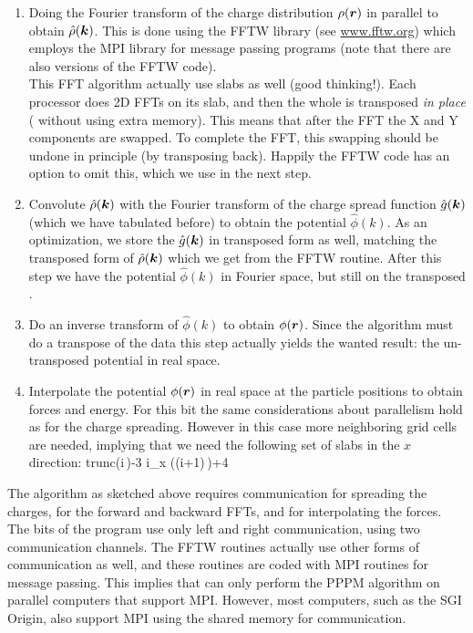 {\begin{enumerate}
\item   Doing the Fourier transform of the charge distribution $\rho(\mbox{\boldmath ${r}$})$ 
        in parallel to obtain $\hat{\rho}(\mbox{\boldmath ${k}$})$. This is done using
        the FFTW library (see \href{http://www.fftw.org}{www.fftw.org})
        which employs the MPI library for message passing programs
        (note that there are also  versions
        of the FFTW code).\\
        This FFT algorithm actually use slabs as well (good
        thinking!).  Each processor does 2D FFTs on its slab, and then
        the whole {\fftgrid} is transposed {\em in place}
        ({\ie} without using extra memory).  This means that after the
        FFT the X and Y components are swapped.  To complete the FFT,
        this swapping should be undone in principle (by transposing
        back).  Happily the FFTW code has an option to omit this,
        which we use in the next step.
\item   Convolute $\hat{\rho}(\mbox{\boldmath ${k}$})$ with the Fourier transform of the
        charge spread function $\hat{g}(\mbox{\boldmath ${k}$})$ (which we have tabulated before)
        to obtain the potential $\hat{\phi}(k)$. 
        As an optimization, we store the $\hat{g}(\mbox{\boldmath ${k}$})$  in transposed form
        as well, matching the transposed form of $\hat{\rho}(\mbox{\boldmath ${k}$})$
        which we get from the FFTW routine. After this step we have the 
        potential $\hat{\phi}(k)$ in Fourier space, but still on the transposed
        {\fftgrid}.
\item   Do an inverse transform of $\hat{\phi}(k)$ to obtain
        ${\phi}(\mbox{\boldmath ${r}$})$. Since the algorithm must do a transpose of the data
        this step actually yields the wanted result: the un-transposed
        potential in real space.
\item   Interpolate the potential ${\phi}(\mbox{\boldmath ${r}$})$ in real space at the particle
        positions to obtain forces and energy. For this bit the same considerations
 	about parallelism hold as for the charge spreading. However in this
        case more neighboring grid cells are needed, implying that we need
        the following set of {\fftgrid} slabs in the $x$ direction:
        \beq
        {\rm trunc}\left(i\,\right)-3 \le i_x \left((i+1)\,\right)+4
        \eeq

\end{enumerate}
The algorithm as sketched above requires communication for spreading
the charges, for the forward and backward FFTs, and for interpolating
the forces.  The {\gromacs} bits of the program use only left and
right communication, {\ie} using two communication channels. The FFTW
routines actually use other forms of communication as well, and these
routines are coded with MPI routines for message passing. This implies
that {\gromacs} can only perform the PPPM algorithm on parallel
computers that support MPI. However, most
 computers, such as the SGI Origin, also
support MPI using the 
shared memory for communication.

}
